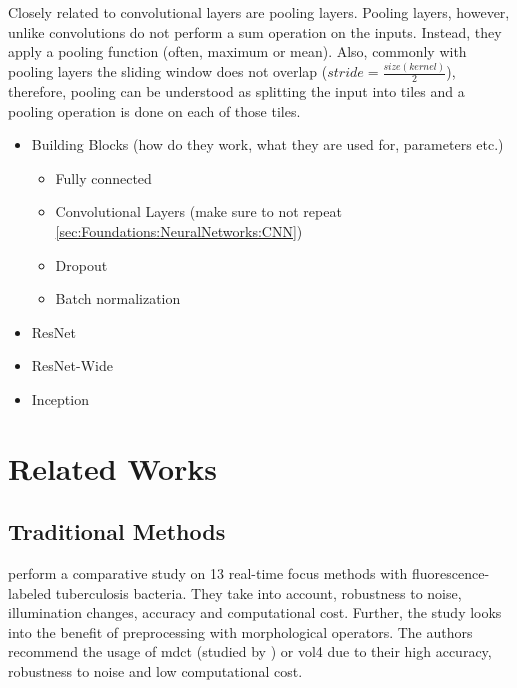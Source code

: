 Closely related to convolutional layers are pooling layers. Pooling layers, however, unlike convolutions do not perform a sum operation on the inputs. Instead, they apply a pooling function (often, maximum or mean). Also, commonly with pooling layers the sliding window does not overlap ($stride = \frac{size(kernel)}{2}$), therefore, pooling can be understood as splitting the input into tiles and a pooling operation is done on each of those tiles. 



\begin{itemize}
    \item Building Blocks (how do they work, what they are used for, parameters etc.)
    \begin{itemize}
        \item Fully connected
        \item Convolutional Layers (make sure to not repeat \autoref{sec:Foundations:NeuralNetworks:CNN})
        \item Dropout
        \item Batch normalization
    \end{itemize}
    \item ResNet \cite{he2016deep}
    \item ResNet-Wide \cite{zagoruyko2016wide}
    \item Inception
\end{itemize}

\section{Related Works}
\label{sec:Foundations:RelatedWorks}


\subsection{Traditional Methods}
\label{sec:Foundations:RelatedWorks:Traditional}


\textcite{mateos-perez2012comparative} perform a comparative study on 13 real-time focus methods with fluorescence-labeled tuberculosis bacteria. They take into account, robustness to noise, illumination changes, accuracy and computational cost. Further, the study looks into the benefit of preprocessing with morphological operators.
The authors recommend the usage of \ac{mdct} (studied by \textcite{lee2008enhanced}) or \ac{vol4} \cite{vollath1988influence} due to their high accuracy, robustness to noise and low computational cost.

